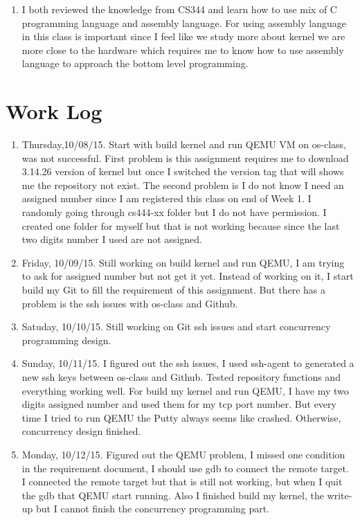 \documentclass[letterpaper,11pt,titlepage]{article}
\begin{document}
\begin{enumerate}
\item I both reviewed the knowledge from CS344 and learn how to use mix of C programming language and assembly language. For using assembly language in this class is important since I feel like we study more about kernel we are more close to the hardware which requires me 
to know how to use assembly language to approach the bottom level programming.

\end{enumerate} 


\section{Work Log}
\begin{enumerate}

\item Thursday,10/08/15. Start with build kernel and run QEMU VM on os-class, was not successful. First problem is this assignment requires me to download 3.14.26 version of
kernel but once I switched the version tag that will shows me the repository not exist. The second problem is I do not know I need an assigned number since I am registered this class on end of Week 1.
I randomly going through cs444-xx folder but I do not have permission. I created one folder for myself but that is not working because since the last two digits number I used are not assigned.

\item Friday, 10/09/15. Still working on build kernel and run QEMU, I am trying to ask for assigned number but not get it yet. Instead of working on it, I start build my Git to fill the requirement of this
assignment. But there has a problem is the ssh issues with os-class and Github.  

\item Satuday, 10/10/15. Still working on Git ssh issues and start concurrency programming design.

\item Sunday, 10/11/15. I figured out the ssh issues, I used ssh-agent to generated a new ssh keys between os-class and Github. Tested repository functions and everything working well. For build my kernel and 
run QEMU, I have my two digits assigned number and used them for my tcp port number. But every time I tried to run QEMU the Putty always seems like crashed. Otherwise, concurrency design finished. 

\item Monday, 10/12/15. Figured out the QEMU problem, I missed one condition in the requirement document, I should use gdb to connect the remote target. I connected the remote target but that is still not working,
but when I quit the gdb that QEMU start running. Also I finished build my kernel, the write-up but I cannot finish the concurrency programming part.

\end{enumerate}
\end{document}
